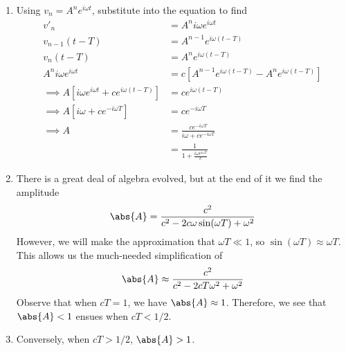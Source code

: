 \documentclass[a4paper]{article}
\begin{document}
\begin{enumerate}[label=(\alph*)]
	\item Using \( v_{n} = A^{n}e^{i \omega t} \), substitute into the equation to find
	\begin{align*}
		v'_{n} & = A^{n}i \omega e^{i \omega t} \\
		v_{n - 1}\!\left( t - T \right) & = A^{n - 1}e^{i \omega \!\left( t - T \right)} \\ 
		v_{n}\!\left( t - T \right) & = A^{n}e^{i \omega \!\left( t - T \right)} \\
		A^{n}i \omega e^{i \omega t} & = c \!\left[ A^{n - 1}e^{i \omega \!\left( t - T \right)} - A^{n}e^{i \omega \!\left( t - T \right)} \right] \\
		\implies A \!\left[ i \omega e^{i \omega t} + ce^{i \omega \!\left( t - T \right)} \right] & = ce^{i \omega \!\left( t - T \right)} \\
		\implies A \!\left[ i \omega + ce^{-i \omega T} \right] & = ce^{-i \omega T} \\
		\implies A & = \frac{ce^{-i \omega T}}{i \omega + ce^{-i \omega T}} \\
			   & = \frac{1}{1 + \displaystyle{\frac{i \omega e^{i \omega T}}{c}}}
	\end{align*}
	\item There is a great deal of algebra evolved, but at the end of it we find the amplitude
	\[
		\abs{A} = \frac{c^{2}}{c^{2} - 2c \omega \sin\!\left(\omega T\right) + \omega^{2}} 
	\]
	However, we will make the approximation that \( \omega T \ll 1 \), so \( \sin\!\left(\omega T\right) \approx \omega T \). This allows us the much-needed simplification of
	\[
		\abs{A} \approx \frac{c^{2}}{c^{2} - 2cT \omega^{2} + \omega^{2}} 
	\]
	Observe that when \( cT = 1 \), we have \( \abs{A} \approx 1 \). Therefore, we see that \( \abs{A} < 1 \) ensues when \( cT < 1 / 2 \).
	\item Conversely, when \( cT > 1 / 2 \), \( \abs{A} > 1 \).
\end{enumerate}

\end{document}
